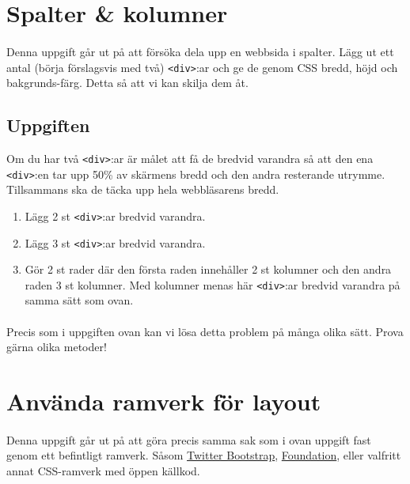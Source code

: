 \documentclass{article}
\begin{document}
  \newpage
  \section{ Spalter \& kolumner }
    \paragraph{}
    Denna uppgift går ut på att försöka dela upp en webbsida i spalter. Lägg ut ett antal (börja förslagsvis med två) \texttt{<div>}:ar och ge de genom CSS bredd, höjd och bakgrunds-färg. Detta så att vi kan skilja dem åt.

    \subsection*{Uppgiften}
      Om du har två \texttt{<div>}:ar är målet att få de bredvid varandra så att den ena \texttt{<div>}:en tar upp 50\% av skärmens bredd och den andra resterande utrymme. Tillsammans ska de täcka upp hela webbläsarens bredd.
      \begin{enumerate}
        \item Lägg 2 st \texttt{<div>}:ar bredvid varandra.
        \item Lägg 3 st \texttt{<div>}:ar bredvid varandra.
        \item Gör 2 st rader där den första raden innehåller 2 st kolumner och den andra raden 3 st kolumner. Med kolumner menas här \texttt{<div>}:ar bredvid varandra på samma sätt som ovan.
      \end{enumerate}
      \paragraph{}
      Precis som i uppgiften ovan kan vi lösa detta problem på många olika sätt. Prova gärna olika metoder!



  \newpage
  \section{ Använda ramverk för layout }
    \paragraph{}
    Denna uppgift går ut på att göra precis samma sak som i ovan uppgift fast genom ett befintligt ramverk. Såsom
    \href{http://getbootstrap.com/}{Twitter Bootstrap},
    \href{http://foundation.zurb.com/}{Foundation},
    eller valfritt annat CSS-ramverk med öppen källkod.
\end{document}
